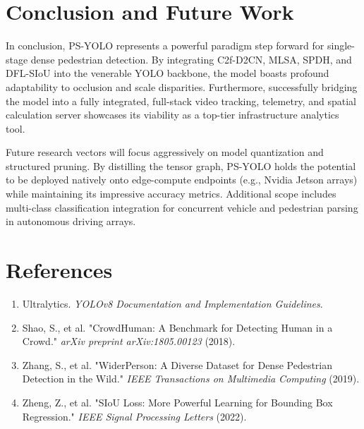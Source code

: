\documentclass[11pt,a4paper]{article}
\begin{document}
\section{Conclusion and Future Work}
In conclusion, PS-YOLO represents a powerful paradigm step forward for single-stage dense pedestrian detection. By integrating C2f-D2CN, MLSA, SPDH, and DFL-SIoU into the venerable YOLO backbone, the model boasts profound adaptability to occlusion and scale disparities. Furthermore, successfully bridging the model into a fully integrated, full-stack video tracking, telemetry, and spatial calculation server showcases its viability as a top-tier infrastructure analytics tool.

Future research vectors will focus aggressively on model quantization and structured pruning. By distilling the tensor graph, PS-YOLO holds the potential to be deployed natively onto edge-compute endpoints (e.g., Nvidia Jetson arrays) while maintaining its impressive accuracy metrics. Additional scope includes multi-class classification integration for concurrent vehicle and pedestrian parsing in autonomous driving arrays.

\section*{References}
\begin{enumerate}
    \item Ultralytics. \textit{YOLOv8 Documentation and Implementation Guidelines}.
    \item Shao, S., et al. "CrowdHuman: A Benchmark for Detecting Human in a Crowd." \textit{arXiv preprint arXiv:1805.00123} (2018).
    \item Zhang, S., et al. "WiderPerson: A Diverse Dataset for Dense Pedestrian Detection in the Wild." \textit{IEEE Transactions on Multimedia Computing} (2019).
    \item Zheng, Z., et al. "SIoU Loss: More Powerful Learning for Bounding Box Regression." \textit{IEEE Signal Processing Letters} (2022).
\end{enumerate}
\end{document}
